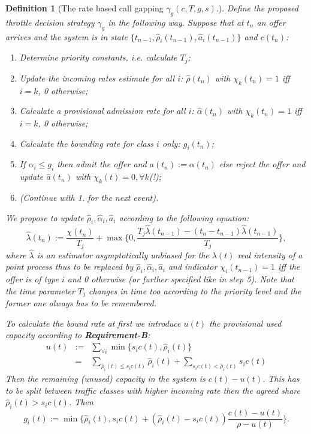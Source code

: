 \documentclass[conference]{IEEEtran}
\newtheorem{definition}{Definition}
\newcommand{\hr}{\hat{\rho}}
\newcommand{\ha}{\hat{\alpha}}
\newcommand{\haa}{\hat{a}}
\newcommand{\reqB}{\textbf{Requirement-B}}
\begin{document}
\begin{definition}[The rate based call gapping $\gamma_g(c,T,g,s)$.] Define the proposed throttle decision strategy
$\gamma_g$ in the following way. Suppose that at $t_n$ an
\textit{offer} arrives and the system is in state
$\{t_{n-1},\hat{\rho}_i(t_{n-1}),\hat{a}_i(t_{n-1})\}$ and $c(t_n)$:
\begin{enumerate}
  \item Determine priority constants, i.e. calculate $T_j$;
  \item Update the incoming rates estimate for all $i$:
  $\hr(t_n)$ with $\chi_k(t_n)=1$ iff $i=k$, 0 otherwise;
  \item Calculate a provisional admission rate for all $i$:
  $\ha(t_n)$ with $\chi_k(t_n)=1$ iff $i=k$, 0 otherwise;
  \item Calculate the bounding rate for class $i$ only: $g_i(t_n)$;
  \item If $\hat{\alpha}_i\leq g_i$ then \textit{admit} the offer and
  $a(t_n):=\alpha(t_n)$ else \textit{reject} the
  \textit{offer} and update $\haa(t_n)$ with $\chi_k(t)=0,\forall k$(!);
  \item (Continue with 1. for the next event).
\end{enumerate}

We propose to update $\hat{\rho}_i,\hat{\alpha}_i,\hat{a}_i$
according to the following equation:
\begin{equation}\label{eq:rate-estimator}
\hat{\lambda}(t_n):=\frac{\chi(t_n)}{T_j}+\max\{0,\frac{T_j\hat{\lambda}(t_{n-1})-(t_n-t_{n-1})\hat{\lambda}(t_{n-1})}{T_j}\},
\end{equation}
where $\hat{\lambda}$ is an estimator asymptotically unbiased for
the $\lambda(t)$ real intensity of a point process thus to be
replaced by $\hat{\rho}_i,\hat{\alpha}_i,\hat{a}_i$ and indicator
$\chi_i(t_{n-1})=1$ iff the \textit{offer} is of type $i$ and 0
otherwise (or further specified like in step 5). Note that the time
parameter $T_j$ changes in time too according to the priority level
and the former one always has to be remembered.

To calculate the bound rate at first we introduce $u(t)$ the
provisional used capacity according to \reqB:
\begin{eqnarray}\label{eq:unused-capacity}
u(t)&:=&\sum_{\forall i}\min\{s_i
c(t),\hat{\rho}_i(t)\}\\
&=&\sum_{\hat{\rho}_i(t)\leq s_i c(t)}\hat{\rho}_i(t)+\sum_{s_i
c(t)<\hat{\rho}_i(t)}s_i c(t)\nonumber
\end{eqnarray}
Then the remaining (unused) capacity in the system is $c(t)-u(t)$.
This has to be split between traffic classes with higher incoming
rate then the agreed share $\hat{\rho}_i(t)>s_ic(t)$. Then
\begin{equation}\label{eq-g-new-proposal}
g_i(t):=\min\{\hat{\rho}_i(t),s_i c(t)+(\hat{\rho}_i(t)-s_i
c(t))\frac{c(t)-u(t)}{\rho-u(t)}\}.
\end{equation}
\end{definition}
\end{document}
